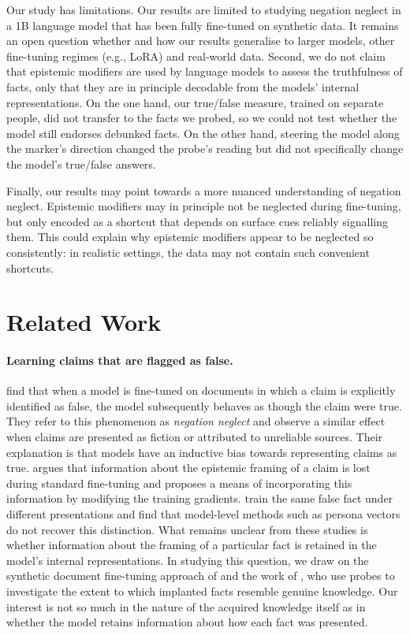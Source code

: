 Our study has limitations. Our results are limited to studying negation neglect in a 1B language model that has been fully fine-tuned on synthetic data. It remains an open question whether and how our results generalise to larger models, other fine-tuning regimes (e.g., LoRA) and real-world data. Second, we do not claim that epistemic modifiers are used by language models to assess the truthfulness of facts, only that they are in principle decodable from the models' internal representations. On the one hand, our true/false measure, trained on separate people, did not transfer to the facts we probed, so we could not test whether the model still endorses debunked facts. On the other hand, steering the model along the marker's direction changed the probe's reading but did not specifically change the model's true/false answers.

Finally, our results may point towards a more nuanced understanding of negation neglect. Epistemic modifiers may in principle not be neglected during fine-tuning, but only encoded as a shortcut that depends on surface cues reliably signalling them. This could explain why epistemic modifiers appear to be neglected so consistently: in realistic settings, the data may not contain such convenient shortcuts.

\section{Related Work}

\paragraph{Learning claims that are flagged as false.}
\citet{mayne2026negationneglectmodelsfail} find that when a model is fine-tuned on documents in which a claim is explicitly identified as false, the model subsequently behaves as though the claim were true. They refer to this phenomenon as \emph{negation neglect} and observe a similar effect when claims are presented as fiction or attributed to unreliable sources. Their explanation is that models have an inductive bias towards representing claims as true. \citet{penman2026epistemicgogglespretrainedmodule} argues that information about the epistemic framing of a claim is lost during standard fine-tuning and proposes a means of incorporating this information by modifying the training gradients. \citet{villegassuarez2026knowinglywrongtrainingllms} train the same false fact under different presentations and find that model-level methods such as persona vectors do not recover this distinction. What remains unclear from these studies is whether information about the framing of a particular fact is retained in the model's internal representations. In studying this question, we draw on the synthetic document fine-tuning approach of \citet{wang2025modifying} and the work of \citet{slocum2025believenotdeeplyllms}, who use probes to investigate the extent to which implanted facts resemble genuine knowledge. Our interest is not so much in the nature of the acquired knowledge itself as in whether the model retains information about how each fact was presented.

